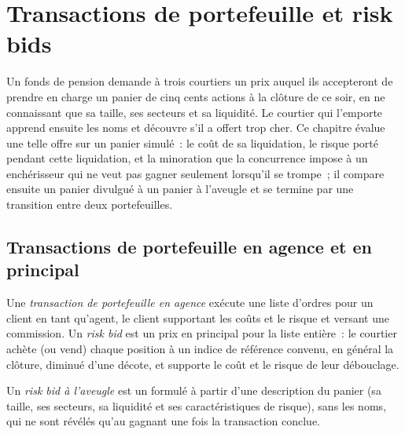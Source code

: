\chapter{Transactions de portefeuille et risk bids}\label{ch:mx:portfolio-trades-and-risk-bids}

Un fonds de pension demande à trois courtiers un prix auquel ils accepteront de prendre en charge un panier de cinq cents actions à la clôture de ce soir, en ne connaissant que sa taille,
ses secteurs et sa liquidité. Le courtier qui l'emporte apprend ensuite les noms et découvre s'il a offert trop cher. Ce chapitre évalue une telle offre sur
un panier simulé~: le coût de sa liquidation, le risque porté pendant cette liquidation, et la minoration que la concurrence impose à un enchérisseur qui ne veut pas
gagner seulement lorsqu'il se trompe~; il compare ensuite un panier divulgué à un panier à l'aveugle et se termine par une transition entre deux portefeuilles.

\section{Transactions de portefeuille en agence et en principal}

\begin{definition}\label{def:mx:portfolio-trades-and-risk-bids:agency}
Une \emph{transaction de portefeuille en agence} exécute une liste d'ordres pour un client en tant qu'agent, le client supportant les coûts et le
risque et versant une commission. Un \emph{risk bid} est un prix en principal pour la liste entière~: le courtier achète (ou vend) chaque position à
un indice de référence convenu, en général la clôture, diminué d'une décote, et supporte le coût et le risque de leur débouclage.
\end{definition}

\begin{definition}\label{def:mx:portfolio-trades-and-risk-bids:blind}
Un \emph{risk bid à l'aveugle} est un  formulé à partir d'une description du panier (sa taille, ses secteurs, sa liquidité et ses caractéristiques
de risque), sans les noms, qui ne sont révélés qu'au gagnant une fois la transaction conclue.
\end{definition}

